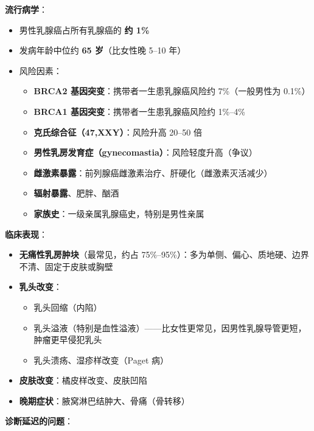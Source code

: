 \vspace{0.5em}
\noindent\textbf{流行病学}：

\begin{itemize}[leftmargin=2cm]
	\item 男性乳腺癌占所有乳腺癌的 \textbf{约 1\%}
	\item 发病年龄中位约 \textbf{65 岁}（比女性晚 5--10 年）
	\item 风险因素：
	\begin{itemize}
		\item \textbf{BRCA2 基因突变}：携带者一生患乳腺癌风险约 7\%（一般男性为 0.1\%）
		\item \textbf{BRCA1 基因突变}：携带者一生患乳腺癌风险约 1\%--4\%
		\item \textbf{克氏综合征（47,XXY）}：风险升高 20--50 倍
		\item \textbf{男性乳房发育症（gynecomastia）}：风险轻度升高（争议）
		\item \textbf{雌激素暴露}：前列腺癌雌激素治疗、肝硬化（雌激素灭活减少）
		\item \textbf{辐射暴露}、肥胖、酗酒
		\item \textbf{家族史}：一级亲属乳腺癌史，特别是男性亲属
	\end{itemize}
\end{itemize}

\vspace{0.5em}
\noindent\textbf{临床表现}：

\begin{itemize}[leftmargin=2cm]
	\item \textbf{无痛性乳房肿块}（最常见，约占 75\%--95\%）：多为单侧、偏心、质地硬、边界不清、固定于皮肤或胸壁
	\item \textbf{乳头改变}：
	\begin{itemize}
		\item 乳头回缩（内陷）
		\item 乳头溢液（特别是血性溢液）——比女性更常见，因男性乳腺导管更短，肿瘤更早侵犯乳头
		\item 乳头溃疡、湿疹样改变（Paget 病）
	\end{itemize}
	\item \textbf{皮肤改变}：橘皮样改变、皮肤凹陷
	\item \textbf{晚期症状}：腋窝淋巴结肿大、骨痛（骨转移）
\end{itemize}

\vspace{0.5em}
\noindent\textbf{诊断延迟的问题}：

